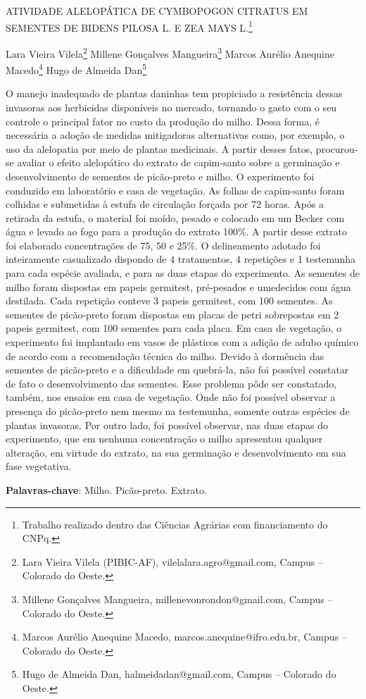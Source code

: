 \documentclass[article,12pt,onesidea,4paper,english,brazil]{abntex2}
\begin{document}
	
	
	\frenchspacing 
	
	\begin{center}
		\LARGE ATIVIDADE ALELOPÁTICA DE CYMBOPOGON CITRATUS EM SEMENTES DE BIDENS PILOSA L. E ZEA MAYS L.\footnote{Trabalho realizado dentro das Ciências Agrárias com financiamento do CNPq.}
		
		\normalsize
		Lara Vieira Vilela\footnote{Lara Vieira Vilela (PIBIC-AF), vilelalara.agro@gmail.com, Campus – Colorado do Oeste.} 
		Millene Gonçalves Mangueira\footnote{Millene Gonçalves Mangueira, millenevonrondon@gmail.com, Campus – Colorado do Oeste.} 
		Marcos Aurélio Anequine Macedo\footnote{Marcos Aurélio Anequine Macedo, marcos.anequine@ifro.edu.br, Campus – Colorado do Oeste.} 
		Hugo de Almeida Dan\footnote{Hugo de Almeida Dan, halmeidadan@gmail.com, Campus – Colorado do Oeste.} 
	\end{center}
	
	\noindent O manejo inadequado de plantas daninhas tem propiciado a resistência dessas
	invasoras aos herbicidas disponíveis no mercado, tornando o gasto com o seu
	controle o principal fator no custo da produção do milho. Dessa forma, é necessária
	a adoção de medidas mitigadoras alternativas como, por exemplo, o uso da
	alelopatia por meio de plantas medicinais. A partir desses fatos, procurou-se avaliar
	o efeito alelopático do extrato de capim-santo sobre a germinação e
	desenvolvimento de sementes de picão-preto e milho. O experimento foi conduzido
	em laboratório e casa de vegetação. As folhas de capim-santo foram colhidas e
	submetidas à estufa de circulação forçada por 72 horas. Após a retirada da estufa, o
	material foi moído, pesado e colocado em um Becker com água e levado ao fogo
	para a produção do extrato 100\%. A partir desse extrato foi elaborado concentrações
	de 75, 50 e 25\%. O delineamento adotado foi inteiramente casualizado dispondo de
	4 tratamentos, 4 repetições e 1 testemunha para cada espécie avaliada, e para as
	duas etapas do experimento. As sementes de milho foram dispostas em papeis
	germitest, pré-pesados e umedecidos com água destilada. Cada repetição conteve 3
	papeis germitest, com 100 sementes. As sementes de picão-preto foram dispostas
	em placas de petri sobrepostas em 2 papeis germitest, com 100 sementes para cada
	placa. Em casa de vegetação, o experimento foi implantado em vasos de plásticos
	com a adição de adubo químico de acordo com a recomendação técnica do milho.
	Devido à dormência das sementes de picão-preto e a dificuldade em quebrá-la, não
	foi possível constatar de fato o desenvolvimento das sementes. Esse problema pôde
	ser constatado, também, nos ensaios em casa de vegetação. Onde não foi possível
	observar a presença do picão-preto nem mesmo na testemunha, somente outras
	espécies de plantas invasoras. Por outro lado, foi possível observar, nas duas
	etapas do experimento, que em nenhuma concentração o milho apresentou qualquer
	alteração, em virtude do extrato, na sua germinação e desenvolvimento em sua fase
	vegetativa.
	
	\vspace{\onelineskip}
	
	\noindent
	\textbf{Palavras-chave}: Milho. Picão-preto. Extrato.
	
\end{document}
